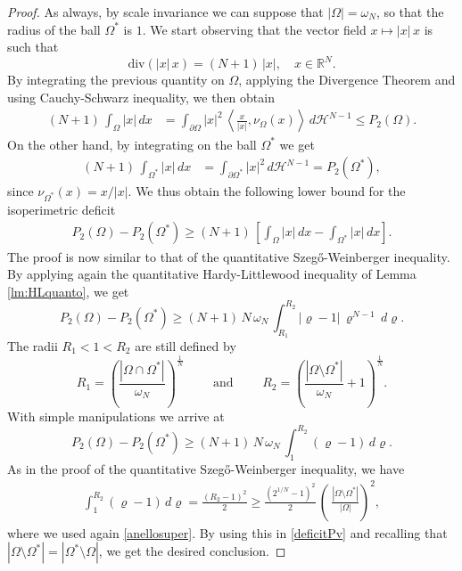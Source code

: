 \documentclass{amsart}
\theoremstyle{definition}
\numberwithin{equation}{section}
\begin{document}
\begin{proof}
As always, by scale invariance we can suppose that $|\Omega|=\omega_N$, so that the radius of the ball $\Omega^*$ is $1$.
We start observing that the vector field $x\mapsto |x|\,x$ is such that
\[
\mathrm{div}\left( |x|\,x\right)=(N+1)\,|x|,\quad x\in\mathbb{R}^N.
\]
By integrating the previous quantity on $\Omega$, applying the Divergence Theorem and using Cauchy-Schwarz inequality, we then obtain
\[
\begin{split}
(N+1)\,\int_{\Omega} |x|\, dx&=\int_{\partial\Omega} |x|^2\,\left\langle \frac{x}{|x|},\nu_\Omega(x)\right\rangle\, d\mathcal H^{N-1}\le P_2(\Omega).
\end{split}
\]
On the other hand, by integrating on the ball $\Omega^*$ we get
\[
\begin{split}
(N+1)\,\int_{\Omega^*} |x|\, dx&=\int_{\partial \Omega^*} |x|^2\, d\mathcal H^{N-1}=P_2(\Omega^*),
\end{split}
\]
since $\nu_{\Omega^*}(x)=x/|x|$. We thus obtain the following lower bound for the isoperimetric deficit
\[
\begin{split}
P_2(\Omega)-P_2(\Omega^*)\ge (N+1)\,\left[\int_{\Omega } |x|\, dx-\int_{\Omega^*} |x|\, dx\right].
\end{split}
\]
The proof is now similar to that of the quantitative Szeg\H{o}-Weinberger inequality. By applying again the quantitative Hardy-Littlewood inequality of Lemma \ref{lm:HLquanto}, we get
\[
P_2(\Omega)-P_2(\Omega^*)\ge (N+1)\,N\,\omega_N\,\int_{R_1}^{R_2} |\varrho-1|\, \varrho^{N-1}\, d\varrho.
\]
The radii $R_1<1<R_2$ are still defined by
\[
R_1=\left(\frac{|\Omega\cap\Omega^*|}{\omega_N}\right)^\frac{1}{N}\qquad \mbox{ and }\qquad R_2=\left(\frac{|\Omega\setminus\Omega^*|}{\omega_N}+1\right)^\frac{1}{N}.
\]
With simple manipulations we arrive at
\begin{equation}
\label{deficitPv}
P_2(\Omega)-P_2(\Omega^*)\ge (N+1)\,N\,\omega_N\,\int_{1}^{R_2} (\varrho-1)\, d\varrho.
\end{equation}
As in the proof of the quantitative Szeg\H{o}-Weinberger inequality, we have
\[
\begin{split}
\int_{1}^{R_2} (\varrho-1)\,  d\varrho=\frac{(R_2-1)^2}{2}\ge \frac{(2^{1/N}-1)^2}{2}\,\left(\, \frac{|\Omega\setminus\Omega^*|}{|\Omega|}\right)^2,
\end{split}
\]
where we used again \eqref{anellosuper}. By using this in \eqref{deficitPv} and recalling that $|\Omega\setminus \Omega^*|=|\Omega^*\setminus \Omega|$, we get the desired conclusion.
\end{proof}
\end{document}
